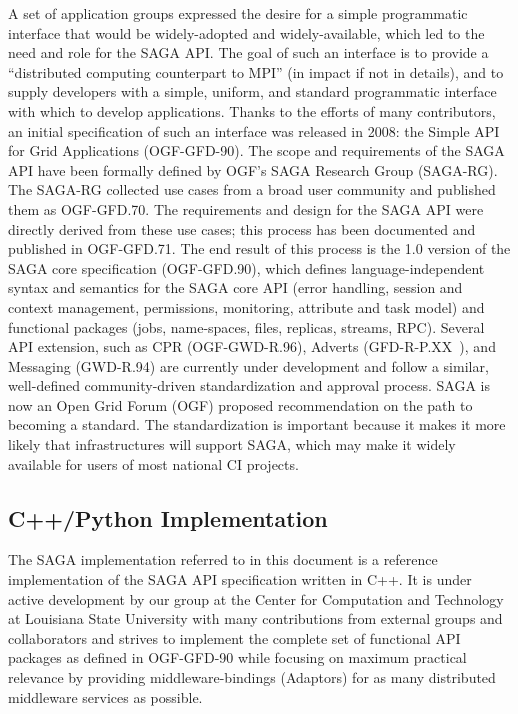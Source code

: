     A set of application groups expressed the desire for a simple
    programmatic interface that would be widely-adopted and
    widely-available, which led to the need and role for the SAGA API.
    The goal of such an interface is to provide a ``distributed
    computing counterpart to MPI'' (in impact if not in details), and to
    supply developers with a simple, uniform, and standard programmatic
    interface with which to develop applications.  Thanks to the efforts
    of many contributors, an initial specification of such an interface
    was released in 2008: the Simple API for Grid Applications
    (OGF-GFD-90). The scope and requirements of the SAGA API have been
    formally defined by OGF's SAGA Research Group (SAGA-RG). The SAGA-RG
    collected use cases from a broad user community and published them
    as OGF-GFD.70. The requirements and design for the SAGA API were
    directly derived from these use cases; this process has been
    documented and published in OGF-GFD.71. The end result of this
    process is the 1.0 version of the SAGA core specification
    (OGF-GFD.90), which defines language-independent syntax and
    semantics for the SAGA core API (error handling, session and context
    management, permissions, monitoring, attribute and task model) and
    functional packages (jobs, name-spaces, files, replicas, streams,
    RPC). Several API extension, such as CPR (OGF-GWD-R.96), Adverts
    (GFD-R-P.XX~), and Messaging (GWD-R.94) are currently under
    development and follow a similar, well-defined community-driven
    standardization and approval process. SAGA is now an Open Grid Forum
    (OGF) proposed recommendation on the path to becoming a standard. 
    The standardization is important because it makes it more likely
    that infrastructures will support SAGA, which may make it widely
    available for users of most national CI projects.
	
\subsection{C++/Python Implementation}

    The SAGA implementation referred to in this document is a reference
    implementation of the SAGA API specification written in C++. It is
    under active development by our group at the Center for Computation
    and Technology at Louisiana State University with many contributions
    from external groups and collaborators and strives to implement the
    complete set of functional API packages as defined in OGF-GFD-90
    while focusing on maximum practical relevance by providing
    middleware-bindings (Adaptors) for as many distributed middleware
    services as possible.

